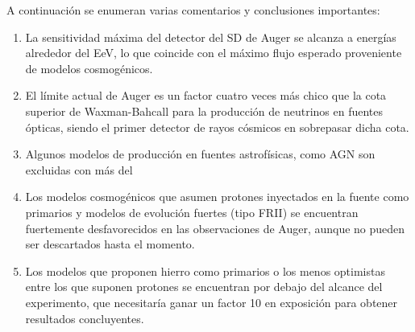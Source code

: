 	A continuaci\'on se enumeran varias comentarios y conclusiones importantes:
	\begin{enumerate}
	 \item La sensitividad m\'axima del detector del SD de Auger se alcanza a energ\'ias alrededor del EeV, lo que coincide con el m\'aximo flujo esperado proveniente de modelos cosmog\'enicos.
	 \item El l\'imite actual de Auger es un factor cuatro veces m\'as chico que la cota superior de Waxman-Bahcall para la producci\'on de neutrinos en fuentes \'opticas, siendo el primer detector de rayos c\'osmicos en sobrepasar dicha cota.
	 \item Algunos modelos de producci\'on en fuentes astrof\'isicas, como AGN son excluidas con m\'as del 
	 \item Los modelos cosmog\'enicos que asumen protones inyectados en la fuente como primarios y modelos de evoluci\'on fuertes (tipo FRII) se encuentran fuertemente desfavorecidos en las observaciones de Auger, aunque no pueden ser descartados hasta el momento.
	 \item Los modelos que proponen hierro como primarios o los menos optimistas entre los que suponen protones se encuentran por debajo del alcance del experimento, que necesitar\'ia ganar un factor 10 en exposici\'on para obtener resultados concluyentes.
	\end{enumerate}
	
